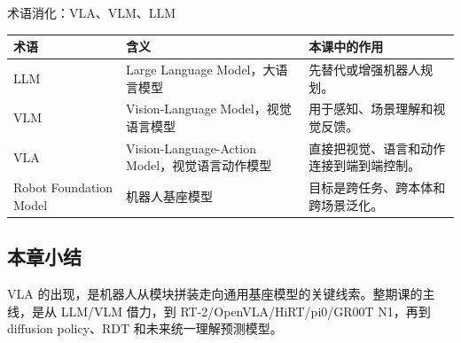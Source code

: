 \begin{knowledgebox}{术语消化：VLA、VLM、LLM}
\noindent\begin{tabularx}{\textwidth}{p{}p{}X}
\toprule
术语 & 含义 & 本课中的作用 \\
\midrule
LLM & Large Language Model，大语言模型 & 先替代或增强机器人规划。 \\
VLM & Vision-Language Model，视觉语言模型 & 用于感知、场景理解和视觉反馈。 \\
VLA & Vision-Language-Action Model，视觉语言动作模型 & 直接把视觉、语言和动作连接到端到端控制。 \\
Robot Foundation Model & 机器人基座模型 & 目标是跨任务、跨本体和跨场景泛化。 \\
\bottomrule
\end{tabularx}
\end{knowledgebox}

\subsection{本章小结}

VLA 的出现，是机器人从模块拼装走向通用基座模型的关键线索。整期课的主线，是从 LLM/VLM 借力，到 RT-2/OpenVLA/HiRT/pi0/GR00T N1，再到 diffusion policy、RDT 和未来统一理解预测模型。

